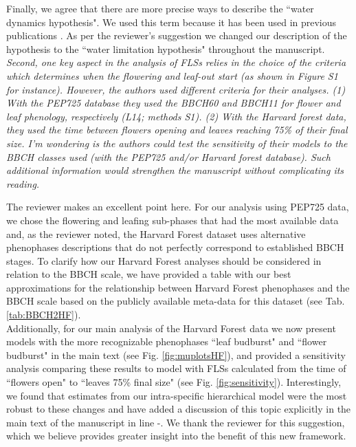 \documentclass{article}[11pt]
\begin{document}
\noindent Finally, we agree that there are more precise ways to describe the ``water dynamics hypothesis". We used this term because it has been used in previous publications \citep{Gougherty2018}. As per the reviewer's suggestion we changed our description of the hypothesis to the ``water limitation hypothesis" throughout the manuscript.\\

\emph{Second, one key aspect in the analysis of FLSs relies in the choice of the criteria which determines when the flowering and leaf-out start (as shown in Figure S1 for instance). However, the authors used different criteria for their analyses. (1) With the PEP725 database they used the BBCH60 and BBCH11 for flower and leaf phenology, respectively (L14; methods S1). (2) With the Harvard forest data, they used the time between flowers opening and leaves reaching 75\% of their final size. I'm wondering is the authors could test the sensitivity of their models to the BBCH classes used (with the PEP725 and/or Harvard forest database). Such additional information would strengthen the manuscript without complicating its reading.}

\noindent The reviewer makes an excellent point here. For our analysis using PEP725 data, we chose the flowering and leafing sub-phases that had the most available data and, as the reviewer noted, the Harvard Forest dataset uses alternative phenophases descriptions that do not perfectly correspond to established BBCH stages. To clarify how our Harvard Forest analyses should be considered in relation to the BBCH scale, we have provided a table with our best approximations for the relationship between Harvard Forest phenophases and the BBCH scale based on the publicly available meta-data for this dataset (see Tab. \ref{tab:BBCH2HF}).\\

\noindent Additionally, for our main analysis of the Harvard Forest data we now present models with the more recognizable phenophases ``leaf budburst" and ``flower budburst" in the main text (see Fig. \ref{fig:muplotsHF}), and provided a sensitivity analysis comparing these results to model with FLSs calculated from the time of ``flowers open" to ``leaves 75\% final size" (see Fig. \ref{fig:sensitivity}). Interestingly, we found that estimates from our intra-specific hierarchical model were the most robust to these changes and have added a discussion of this topic explicitly in the main text of the manuscript in line -. We thank the reviewer for this suggestion, which we believe provides greater insight into the benefit of this new framework. \\  
\end{document}
